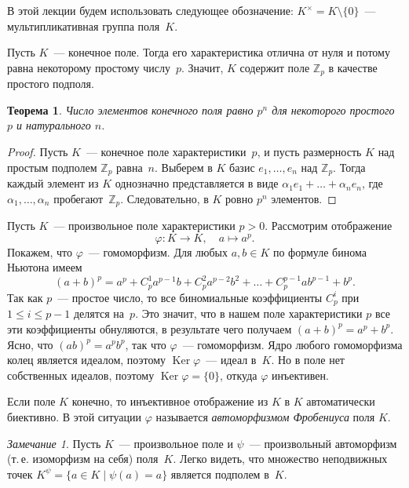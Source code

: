\documentclass[a4paper,10pt]{amsart}
\newcommand{\Ker}{\mathop{\mathrm{Ker}}}
\def\ZZ{{\mathbb Z}}%
\newtheorem{theorem}{Теорема}
\theoremstyle{definition}
\theoremstyle{remark}
\newtheorem{remark}{Замечание}
\begin{document}
\medskip

В этой лекции будем использовать следующее обозначение: $K^\times =
K \setminus \lbrace 0 \rbrace$~--- мультипликативная группа
поля~$K$.

Пусть $K$~--- конечное поле. Тогда его характеристика отлична от
нуля и потому равна некоторому простому числу~$p$. Значит, $K$
содержит поле $\ZZ_p$ в качестве простого подполя.

\begin{theorem} \label{thm1}
	Число элементов конечного поля равно $p^n$ для некоторого простого
	$p$ и натурального $n$.
\end{theorem}

\begin{proof}
	Пусть $K$~--- конечное поле характеристики~$p$, и пусть размерность
	$K$ над простым подполем $\ZZ_p$ равна~$n$. Выберем в $K$ базис
	$e_1, \ldots, e_n$ над $\ZZ_p$. Тогда каждый элемент из $K$
	однозначно представляется в виде $\alpha_1 e_1 + \ldots + \alpha_n
	e_n$, где $\alpha_1, \ldots, \alpha_n$ пробегают~$\ZZ_p$.
	Следовательно, в $K$ ровно $p^n$ элементов.
\end{proof}

Пусть $K$~--- произвольное поле характеристики $p > 0$. Рассмотрим
отображение
$$
\varphi \colon K \to K, \quad a \mapsto a^p.
$$
Покажем, что $\varphi$~--- гомоморфизм. Для любых $a,b \in K$ по
формуле бинома Ньютона имеем
$$
(a + b)^p = a^p + C_p^1 a^{p-1}b + C_p^2 a^{p-2}b^2 + \ldots +
C_p^{p-1} a b^{p-1} + b^p.
$$
Так как $p$~--- простое число, то все биномиальные коэффициенты
$C_p^i$ при $1 \leqslant i \leqslant p-1$ делятся на~$p$. Это
значит, что в нашем поле характеристики $p$ все эти коэффициенты
обнуляются, в результате чего получаем $(a + b)^p = a^p + b^p$.
Ясно, что $(ab)^p = a^p b^p$, так что $\varphi$~--- гомоморфизм.
Ядро любого гомоморфизма колец является идеалом, поэтому $\Ker
\varphi$~--- идеал в~$K$. Но в поле нет собственных идеалов, поэтому
$\Ker \varphi = \lbrace 0 \rbrace$, откуда $\varphi$ инъективен.

Если поле $K$ конечно, то инъективное отображение из $K$ в $K$
автоматически биективно. В этой ситуации $\varphi$ называется {\it
	автоморфизмом Фробениуса} поля $K$.

\begin{remark}
	Пусть $K$~--- произвольное поле и $\psi$~--- произвольный
	автоморфизм (т.\,е. изоморфизм на себя) поля~$K$. Легко видеть, что
	множество неподвижных точек $K^{\psi} = \{ a \in K \mid \psi(a) =
	a\}$ является подполем в~$K$.
\end{remark}
\end{document}
